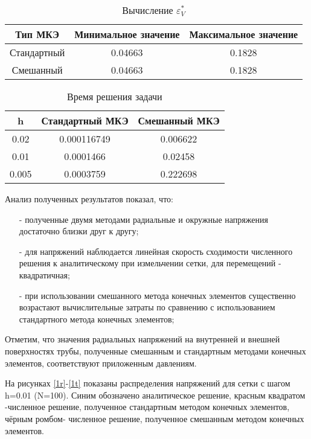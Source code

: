 \documentclass[a4paper,14pt]{extarticle}
\begin{document}
\begin{spacing}{1.0}
\newpage

\begin{table}
\caption{Вычисление $\varepsilon^{*}_V$}
\label{tabl:EpsV1}
\begin{center}
\begin{tabular}{|c|c|c|}
\hline
Тип МКЭ & Минимальное значение & Максимальное значение \\
\hline
Стандартный & 0.04663 & 0.1828 \\
\hline
Смешанный & 0.04663 &  0.1828 \\
\hline
\end{tabular}
\end{center}
\end{table}
 
\begin{table}
\caption{Время решения задачи}
\label{tabl:Time1}
\begin{center}
\begin{tabular}{|c|c|c|}
\hline
h & Стандартный МКЭ & Смешанный МКЭ \\
\hline
0.02 & 0.000116749 & 0.006622 \\
\hline
0.01 & 0.0001466 &  0.02458 \\
\hline
0.005 & 0.0003759 &  0.222698 \\
\hline
\end{tabular}
\end{center}
\end{table}
\end{spacing}


Анализ полученных результатов показал, что:
\begin{itemize}
\item[-]полученные двумя методами радиальные и окружные напряжения достаточно близки друг к другу;
\item[-]для напряжений наблюдается линейная скорость сходимости численного решения к аналитическому при измельчении сетки, для перемещений - квадратичная;
\item[-]при использовании смешанного метода конечных элементов существенно возрастают вычислительные затраты по сравнению с использованием стандартного метода конечных элементов;
\end{itemize}

Отметим, что значения радиальных напряжений на внутренней и внешней поверхностях трубы, полученные смешанным и стандартным методами конечных элементов, соответствуют приложенным давлениям. 

На рисунках \ref{1r}-\ref{1t} показаны распределения напряжений для сетки с шагом h=0.01 (N=100). Синим обозначено аналитическое решение, красным квадратом -численное решение, полученное стандартным методом конечных элементов, чёрным ромбом- численное решение, полученное смешанным методом конечных элементов. 
\end{document}
